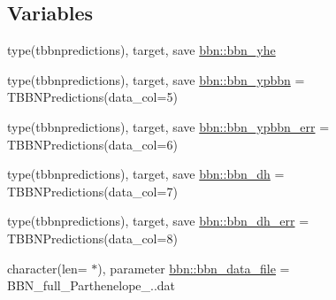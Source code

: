 \subsection*{Variables}
\begin{DoxyCompactItemize}
\item 
type(tbbnpredictions), target, save \mbox{\hyperlink{namespacebbn_a32b631b9e3dda13eb68cc107abe6b861}{bbn\+::bbn\+\_\+yhe}}
\item 
type(tbbnpredictions), target, save \mbox{\hyperlink{namespacebbn_a4f282765adaec1cd6e128f858dbc245b}{bbn\+::bbn\+\_\+ypbbn}} = T\+B\+B\+N\+Predictions(data\+\_\+col=5)
\item 
type(tbbnpredictions), target, save \mbox{\hyperlink{namespacebbn_a21e11bb5000d0be2b824a94078d295a1}{bbn\+::bbn\+\_\+ypbbn\+\_\+err}} = T\+B\+B\+N\+Predictions(data\+\_\+col=6)
\item 
type(tbbnpredictions), target, save \mbox{\hyperlink{namespacebbn_af26d781a68adbe31f1993cc7e36a6e50}{bbn\+::bbn\+\_\+dh}} = T\+B\+B\+N\+Predictions(data\+\_\+col=7)
\item 
type(tbbnpredictions), target, save \mbox{\hyperlink{namespacebbn_af20311a952d5520b6e4f5a44795175a3}{bbn\+::bbn\+\_\+dh\+\_\+err}} = T\+B\+B\+N\+Predictions(data\+\_\+col=8)
\item 
character(len= $\ast$), parameter \mbox{\hyperlink{namespacebbn_a177fdccd2bbdc4ff1dd71c8047184d91}{bbn\+::bbn\+\_\+data\+\_\+file}} = \textquotesingle{}B\+B\+N\+\_\+full\+\_\+\+Parthenelope\+\_..\+dat\textquotesingle{}
\end{DoxyCompactItemize}
